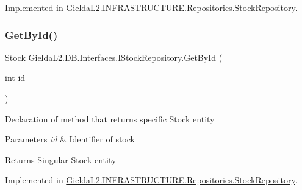 Implemented in \mbox{\hyperlink{class_gielda_l2_1_1_i_n_f_r_a_s_t_r_u_c_t_u_r_e_1_1_repositories_1_1_stock_repository_a444dab153a9efe503ab774da96cfa4e7}{Gielda\+L2.\+I\+N\+F\+R\+A\+S\+T\+R\+U\+C\+T\+U\+R\+E.\+Repositories.\+Stock\+Repository}}.

\mbox{\label{interface_gielda_l2_1_1_d_b_1_1_interfaces_1_1_i_stock_repository_adceb4897529ba90f63534e22f02c5701}} 
\subsubsection{\texorpdfstring{GetById()}{GetById()}}
{\footnotesize\ttfamily \mbox{\hyperlink{class_gielda_l2_1_1_d_b_1_1_entities_1_1_stock}{Stock}} Gielda\+L2.\+D\+B.\+Interfaces.\+I\+Stock\+Repository.\+Get\+By\+Id (\begin{DoxyParamCaption}\item[{int}]{id }\end{DoxyParamCaption})}



Declaration of method that returns specific Stock entity 


\begin{DoxyParams}{Parameters}
{\em id} & Identifier of stock\\
\hline
\end{DoxyParams}
\begin{DoxyReturn}{Returns}
Singular Stock entity
\end{DoxyReturn}


Implemented in \mbox{\hyperlink{class_gielda_l2_1_1_i_n_f_r_a_s_t_r_u_c_t_u_r_e_1_1_repositories_1_1_stock_repository_ab4ff737a226f62c0abbe80751029bbdf}{Gielda\+L2.\+I\+N\+F\+R\+A\+S\+T\+R\+U\+C\+T\+U\+R\+E.\+Repositories.\+Stock\+Repository}}.

\mbox{\label{interface_gielda_l2_1_1_d_b_1_1_interfaces_1_1_i_stock_repository_af6aeb871715f10bc3a69ef381050442c}} 
